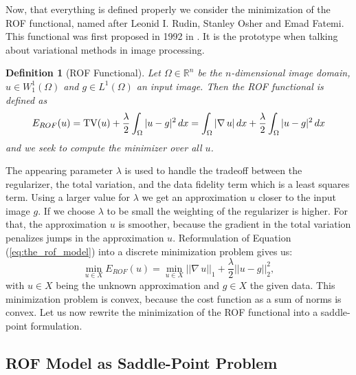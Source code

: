 \documentclass[abstracton]{scrreprt}
\newtheorem{definition}[theorem]{Definition}
\begin{document}
        Now, that everything is defined properly we consider the minimization of the ROF functional, named after Leonid I. Rudin, Stanley Osher and Emad Fatemi. This functional was first proposed in 1992 in \cite{ROF}. It is the prototype when talking about variational methods in image processing.
        \begin{definition}[ROF Functional] %
        \label{def:the_rof_functional}
            Let $\Omega \in \mathbb{R}^{n}$ be the $n$-dimensional image domain, $u \in W_{1}^{1}(\Omega)$ and $g \in L^{1}(\Omega)$ an input image. Then the ROF functional is defined as
                \begin{equation}
                    E_{ROF}(u) = \textnormal{TV}(u) + \frac{\lambda}{2} \int_{\Omega} |u - g|^{2} \, dx = \int_{\Omega} |\nabla \, u| \, dx + \frac{\lambda}{2} \int_{\Omega} |u - g|^{2} \, dx
                    \label{eq:the_rof_model}
                \end{equation}
            and we seek to compute the minimizer over all $u$.
        \end{definition}
        The appearing parameter $\lambda$ is used to handle the tradeoff between the regularizer, the total variation, and the data fidelity term which is a least squares term. Using a larger value for $\lambda$ we get an approximation $u$ closer to the input image $g$. If we choose $\lambda$ to be small the weighting of the regularizer is higher. For that, the approximation $u$ is smoother, because the gradient in the total variation penalizes jumps in the approximation $u$. Reformulation of Equation (\ref{eq:the_rof_model}) into a discrete minimization problem gives us:
            \begin{equation}
                \min_{u \in X} E_{ROF}(u) = \min_{u \in X} ||\nabla \, u||_{1} + \frac{\lambda}{2} ||u - g||_{2}^{2},
            \label{eq:discrete_rof_model}
            \end{equation}
        with $u \in X$ being the unknown approximation and $g \in X$ the given data. This minimization problem is convex, because the cost function as a sum of norms is convex. Let us now rewrite the minimization of the ROF functional into a saddle-point formulation.

        \subsection{ROF Model as Saddle-Point Problem} %
        \label{sub:rof_model_as_saddle_point_problem}
\end{document}
